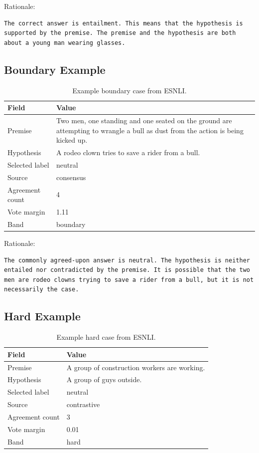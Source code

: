 \documentclass[11pt]{article}
\newcommand{\dataset}[1]{\textsc{#1}}
\begin{document}
Rationale:
\begin{lstlisting}
The correct answer is entailment. This means that the hypothesis is supported by the premise. The premise and the hypothesis are both about a young man wearing glasses.
\end{lstlisting}

\subsection{Boundary Example}

\begin{table}[H]
\centering
\caption{Example boundary case from \dataset{ESNLI}.}
\begin{tabularx}{\linewidth}{lX}
\toprule
Field & Value \\
\midrule
Premise & Two men, one standing and one seated on the ground are attempting to wrangle a bull as dust from the action is being kicked up. \\
Hypothesis & A rodeo clown tries to save a rider from a bull. \\
Selected label & neutral \\
Source & consensus \\
Agreement count & 4 \\
Vote margin & 1.11 \\
Band & boundary \\
\bottomrule
\end{tabularx}
\end{table}

Rationale:
\begin{lstlisting}
The commonly agreed-upon answer is neutral. The hypothesis is neither entailed nor contradicted by the premise. It is possible that the two men are rodeo clowns trying to save a rider from a bull, but it is not necessarily the case.
\end{lstlisting}

\subsection{Hard Example}

\begin{table}[H]
\centering
\caption{Example hard case from \dataset{ESNLI}.}
\begin{tabularx}{\linewidth}{lX}
\toprule
Field & Value \\
\midrule
Premise & A group of construction workers are working. \\
Hypothesis & A group of guys outside. \\
Selected label & neutral \\
Source & contrastive \\
Agreement count & 3 \\
Vote margin & 0.01 \\
Band & hard \\
\bottomrule
\end{tabularx}
\end{table}
\end{document}
